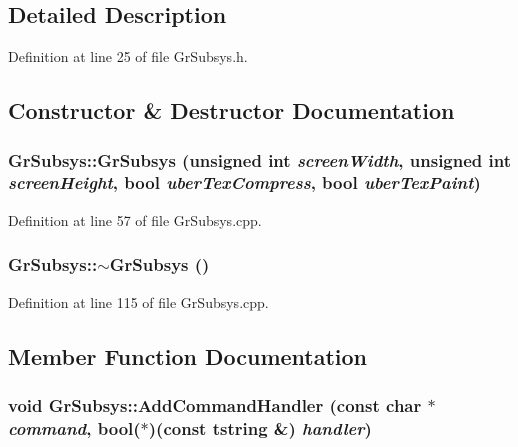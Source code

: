 \subsection{Detailed Description}


Definition at line 25 of file GrSubsys.h.

\subsection{Constructor \& Destructor Documentation}
\hypertarget{class_gr_subsys_96c2a23cef6078de5a5982ae9c23dfae}{
\subsubsection[{GrSubsys}]{\setlength{\rightskip}{0pt plus 5cm}GrSubsys::GrSubsys (unsigned int {\em screenWidth}, \/  unsigned int {\em screenHeight}, \/  bool {\em uberTexCompress}, \/  bool {\em uberTexPaint})}}
\label{class_gr_subsys_96c2a23cef6078de5a5982ae9c23dfae}




Definition at line 57 of file GrSubsys.cpp.\hypertarget{class_gr_subsys_1fe11cc4b9217dcf96f4e712a467e4b8}{
\subsubsection[{$\sim$GrSubsys}]{\setlength{\rightskip}{0pt plus 5cm}GrSubsys::$\sim$GrSubsys ()}}
\label{class_gr_subsys_1fe11cc4b9217dcf96f4e712a467e4b8}




Definition at line 115 of file GrSubsys.cpp.

\subsection{Member Function Documentation}
\hypertarget{class_gr_subsys_8f2ca0d3463ad8e1c921b3d21a7f9e6e}{
\subsubsection[{AddCommandHandler}]{\setlength{\rightskip}{0pt plus 5cm}void GrSubsys::AddCommandHandler (const char $\ast$ {\em command}, \/  bool($\ast$)(const {\bf tstring} \&) {\em handler})}}
\label{class_gr_subsys_8f2ca0d3463ad8e1c921b3d21a7f9e6e}




